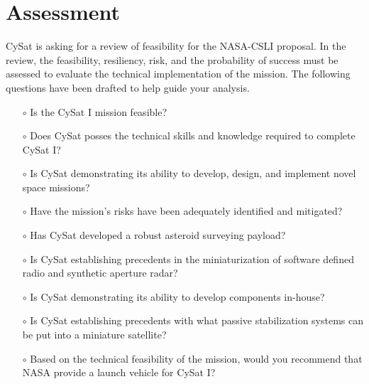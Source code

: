 \documentclass[nocover]            %
{CSLI}                       %
\begin{document}
\section{Assessment}
CySat is asking for a review of feasibility for the NASA-CSLI proposal. In the review, the feasibility, resiliency, risk, and the probability of success must be assessed to evaluate the technical implementation of the mission. The following questions have been drafted to help guide your analysis.\\
\begin{itemize}
\item[$\circ$]Is the CySat I mission feasible?\\
\item[$\circ$]Does CySat posses the technical skills and knowledge required to complete CySat I?\\
\item[$\circ$]Is CySat demonstrating its ability to develop, design, and implement novel space missions?\\
\item[$\circ$]Have the mission's risks have been adequately identified and mitigated?\\
\item[$\circ$]Has CySat developed a robust asteroid surveying payload?\\
\item[$\circ$]Is CySat establishing precedents in the miniaturization of software defined radio and synthetic aperture radar?\\
\item[$\circ$]Is CySat demonstrating its ability to develop components in-house?\\
\item[$\circ$]Is CySat establishing precedents with what passive stabilization systems can be put into a miniature satellite?\\
\item[$\circ$]Based on the technical feasibility of the mission, would you recommend that NASA provide a launch vehicle for CySat I?\\
\end{itemize}
\newpage
\end{document}
